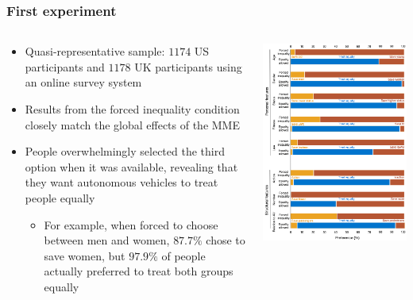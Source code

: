 \documentclass[aspectratio=169]{beamer}
\begin{document}
\begin{frame}
    \frametitle{First experiment}
    \begin{columns}
        \begin{column}{0.6\linewidth}
            \begin{itemize}
                \item Quasi-representative sample: $1174$ US participants and $1178$ UK participants using an online survey system
                \item Results from the forced inequality condition closely match the global effects of the MME
                \item People overwhelmingly selected the third option when it was available, revealing that they want autonomous vehicles to treat people equally
                \begin{itemize}
                    \item For example, when forced to choose between men and women, $87.7\%$ chose to save women, but $97.9\%$ of people actually preferred to treat both groups equally
                \end{itemize}
            \end{itemize}
        \end{column}
        \begin{column}{0.4\linewidth}
            \includegraphics[width=0.9\linewidth]{assets/against-mme-first-experiment.png}
        \end{column}
    \end{columns}
\end{frame}
\end{document}

